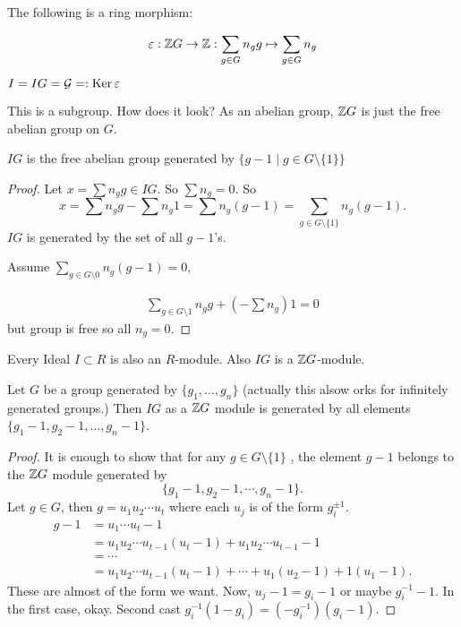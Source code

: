 The following is a ring morphism:
\begin{definition}
    \[
    \varepsilon: \mathbb{Z} G \to  \mathbb{Z}: \sum_{g \in G} n_g g \mapsto  \sum_{g \in G} n_g
    \]
\end{definition}
\begin{definition}
    $I = IG = \mathcal G =: \operatorname{Ker} \varepsilon$
\end{definition}
This is a subgroup. How does it look?
As an abelian group, $ \mathbb{Z} G$ is just the free abelian group on $G$.

\begin{prop}[3.3]
    $IG$ is the free abelian group generated by  $\{g - 1  \mid  g \in G \setminus \{1\} \} $
\end{prop}
\begin{proof}
    Let $x = \sum n_g g \in IG$.
    So $\sum n_g = 0$.
    So 
    \[
        x = \sum n_g g - \sum n_g 1 = \sum n_g (g-1) = \sum_{g \in G \setminus \{ 1\} } n_g (g-1)
    .\] 
    $IG$ is generated by the set of all $g-1$'s.

    Assume  $\sum_{g \in G\setminus 0} n_g(g-1) = 0$, 

    \begin{align*}
        \sum_{g \in G \setminus 1} n_g g + (- \sum n_g) 1 = 0
    \end{align*}
    but group is free so all $n_g = 0$.
\end{proof}

Every Ideal $I \subset R$ is also an $R$-module.
Also $IG$ is a  $\mathbb{Z} G$-module.

\begin{prop}
    Let $G$ be a group generated by $\{g_1, \ldots, g_n\} $ (actually this alsow orks for infinitely generated groups.)
    Then $IG$ as a  $\mathbb{Z} G$ module is generated by all elements $\{g_1-1, g_2-1, \ldots, g_n - 1 \}$.
\end{prop}

\begin{proof}
It is enough to show that for any $g \in G \setminus \{ 1\} $    , the element $g - 1$ belongs to the $ \mathbb{Z} G$ module generated by 
\[
\{g_1 -1, g_2-1, \cdots, g_n-1\} 
.\] 
Let $g \in  G$, then $g = u_1 u_2 \cdots u_t$ where each $u_j$ is of the form  $g_i^{\pm 1}$.
\begin{align*}
    g - 1 &= u_1 \cdots u_t - 1\\
          &= u_1 u_2 \cdots u_{t-1}(u_t - 1) + u_1 u_2 \cdots u_{t-1} - 1\\
          &= \cdots\\
          &= u_1 u_2 \cdots u_{t-1}(u_{t}-1) + \cdots + u_1 (u_2-1) + 1 (u_1 -1)
.\end{align*}
These are almost of the form we want.
Now, $u_j - 1 = g_i -1 $ or maybe  $g^{-1}_i - 1$.
In the first case, okay.
Second cast $g_i ^{-1}(1-g_i) = (- g_i^{-1})(g_i -1)$.
\end{proof}


